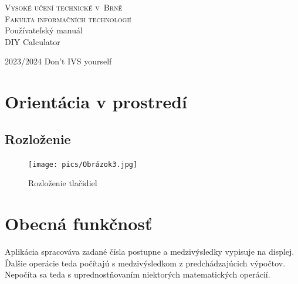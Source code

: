 \documentclass[11pt, a4paper]{article}
\begin{document}
\begin{titlepage}
\begin{center}
\Huge\textsc{Vysoké učení technické v~Brně\\
\huge{Fakulta informačních technologií}}\\
\Huge Používateľský manuál\\[0.5em]
\huge DIY Calculator\\
\end{center}
{\Large {2023/2024 \hfill Don't IVS yourself}}
\end{titlepage}
\newpage 

\tableofcontents

\newpage 

\section{Orientácia v prostredí}
\subsection{Rozloženie}

\begin{figure}[h]
    \centering
    \texttt{[image: pics/Obrázok3.jpg]}
    \caption{Rozloženie tlačidiel}
    \label{fig:enter-label}
\end{figure}

\section*{Obecná funkčnosť}

Aplikácia spracováva zadané čísla postupne a medzivýsledky vypisuje na displej. Ďalšie operácie teda počítajú s medzivýsledkom z predchádzajúcich výpočtov. Nepočíta sa teda s uprednostňovaním niektorých matematických operácií.
\end{document}
